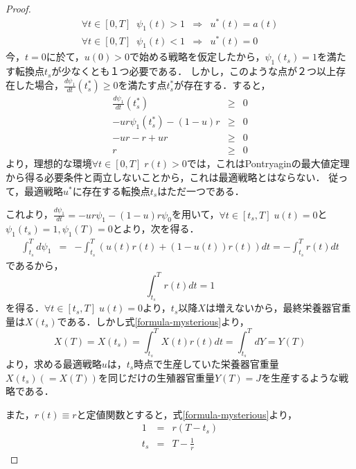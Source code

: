 \documentclass[uplatex, dvipdfmx]{jsarticle}
\begin{document}
\begin{proof}
    \begin{eqnarray}
        \forall t\in [0,T]\;\; \psi_1(t)>1 &\Rightarrow& u^*(t)=a(t) \\
        \forall t\in [0,T]\;\; \psi_1(t)<1 &\Rightarrow& u^*(t)=0
    \end{eqnarray}
    今，$t=0$に於て，$u(0)>0$で始める戦略を仮定したから，$\psi_1(t_s)=1$を満たす転換点$t_s$が少なくとも１つ必要である．
    しかし，このような点が２つ以上存在した場合，$\frac{d\psi_1}{dt}(t^*_s)\ge 0$を満たす点$t^*_s$が存在する．すると，
    \begin{eqnarray*}
        \frac{d\psi_1}{dt}(t^*_s) &\ge& 0 \\
        -ur\psi_1(t^*_s)-(1-u)r &\ge& 0 \\
        -ur-r+ur&\ge&0\\
        r&\ge&0
    \end{eqnarray*}
    より，理想的な環境$\forall t\in [0,T]\; r(t)>0$では，これはPontryaginの最大値定理から得る必要条件と両立しないことから，これは最適戦略とはならない．
    従って，最適戦略$u^*$に存在する転換点$t_s$はただ一つである．

    これより，$\frac{d\psi_1}{dt}=-ur\psi_1-(1-u)r\psi_0$を用いて，$\forall t\in [t_s,T]\; u(t)=0$と$\psi_1(t_s)=1,\psi_1(T)=0$とより，次を得る．
    \begin{eqnarray*}
        \int^T_{t_s}d\psi_1 &=& -\int^T_{t_s}(u(t)r(t)+(1-u(t))r(t))dt = -\int^T_{t_s}r(t)dt
    \end{eqnarray*}
    であるから，
    \begin{equation}\label{formula-mysterious}
        \int^T_{t_s}r(t)dt = 1
    \end{equation}
    を得る．$\forall t\in [t_s,T]\; u(t)=0$より，$t_s$以降$X$は増えないから，最終栄養器官重量は$X(t_s)$である．しかし式\ref{formula-mysterious}より，
    \begin{equation}
        X(T) = X(t_s) = \int^T_{t_s}X(t)r(t)dt = \int^T_{t_s}dY = Y(T)
    \end{equation}
    より，求める最適戦略$u$は，$t_s$時点で生産していた栄養器官重量$X(t_s)(=X(T))$を同じだけの生殖器官重量$Y(T)=J$を生産するような戦略である．

    また，$r(t)\equiv r$と定値関数とすると，式\ref{formula-mysterious}より，
    \begin{eqnarray*}
        1 &=& r(T-t_s) \\
        t_s &=& T-\frac{1}{r}
    \end{eqnarray*}
\end{proof}
\end{document}
